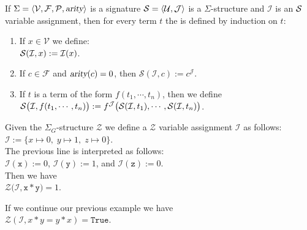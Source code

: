 \begin{Definition}
  If $\Sigma = \langle \mathcal{V}, \mathcal{F}, \mathcal{P}, \textsl{arity} \rangle$ is a signature
  $\struct = \pair(\mathcal{U},\mathcal{J})$ is a  $\Sigma$-structure and $\mathcal{I}$ is an  $\mathcal{S}$
    variable assignment, then for every term $t$ the  
     is defined by induction on $t$:
    \begin{enumerate}
    \item If $x \in \mathcal{V}$ we define: \\[0.2cm]
          \hspace*{1.3cm} $\mathcal{S}(\mathcal{I}, x) := \mathcal{I}(x)$.
    \item If $c \in \mathcal{F}$ and $\textsl{arity}(c) = 0$, then $\mathcal{S}(\mathcal{I}, c) := c^\mathcal{J}$.
    \item If $t$ is a term of the form $f(t_1,\cdots,t_n)$, then we define \\[0.2cm]
          \hspace*{1.3cm} $\mathcal{S}\bigl(\mathcal{I}, f(t_1,\cdots,t_n)\bigr) := 
                           f^\mathcal{J}\bigl( \mathcal{S}(\mathcal{I}, t_1), \cdots, \mathcal{S}(\mathcal{I}, t_n) \bigr)$.
                           \eox
    \end{enumerate}
\end{Definition}

\exampleEng
Given the $\Sigma_G$-structure
$\mathcal{Z}$ we define a $\mathcal{Z}$ variable assignment $\mathcal{I}$ as follows:
\\[0.2cm]
\hspace*{1.3cm} $\mathcal{I} := \bigl\{ x \mapsto 0,\; y \mapsto 1,\; z \mapsto 0\bigr\}$.
\\[0.2cm]
The previous line is interpreted as follows:
\\[0.2cm]
\hspace*{1.3cm} $\mathcal{I}(\mathtt{x}) := 0$, \quad $\mathcal{I}(\mathtt{y}) := 1$, \quad and \quad $\mathcal{I}(\mathtt{z}) := 0$.
\\[0.2cm]
Then we have  \\[0.2cm]
\hspace*{1.3cm}  $\mathcal{Z}\bigl(\mathcal{I}, \mathtt{x} * \mathtt{y} \bigr) = 1$. \eox



\exampleEng
If we continue our previous example we have
\\[0.2cm]
\hspace*{1.3cm} 
$\mathcal{Z}(\mathcal{I},x * y = y * x) = \mathtt{True}$.
\eox

